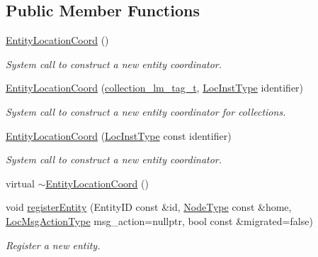 \subsection*{Public Member Functions}
\begin{DoxyCompactItemize}
\item 
\hyperlink{structvt_1_1location_1_1_entity_location_coord_a84d2166e5a2c192b081c222e15e93882}{Entity\+Location\+Coord} ()
\begin{DoxyCompactList}\small\item\em System call to construct a new entity coordinator. \end{DoxyCompactList}\item 
\hyperlink{structvt_1_1location_1_1_entity_location_coord_a0a25560f861221daafca33ce2657f04b}{Entity\+Location\+Coord} (\hyperlink{structvt_1_1location_1_1collection__lm__tag__t}{collection\+\_\+lm\+\_\+tag\+\_\+t}, \hyperlink{namespacevt_1_1location_a4db6456e8024af2d23fc5ae560fef866}{Loc\+Inst\+Type} identifier)
\begin{DoxyCompactList}\small\item\em System call to construct a new entity coordinator for collections. \end{DoxyCompactList}\item 
\hyperlink{structvt_1_1location_1_1_entity_location_coord_a5dcddcc605ab3cd16d94161e895b88e3}{Entity\+Location\+Coord} (\hyperlink{namespacevt_1_1location_a4db6456e8024af2d23fc5ae560fef866}{Loc\+Inst\+Type} const identifier)
\begin{DoxyCompactList}\small\item\em System call to construct a new entity coordinator. \end{DoxyCompactList}\item 
virtual \hyperlink{structvt_1_1location_1_1_entity_location_coord_af68fd9bb9fcbf02f693ba2af503ed409}{$\sim$\+Entity\+Location\+Coord} ()
\item 
void \hyperlink{structvt_1_1location_1_1_entity_location_coord_a3d7f6c252ad5cb8d1084620946245970}{register\+Entity} (Entity\+ID const \&id, \hyperlink{namespacevt_a866da9d0efc19c0a1ce79e9e492f47e2}{Node\+Type} const \&home, \hyperlink{namespacevt_1_1location_ad0a130e4d79e745543925240e13e8f08}{Loc\+Msg\+Action\+Type} msg\+\_\+action=nullptr, bool const \&migrated=false)
\begin{DoxyCompactList}\small\item\em Register a new entity. \end{DoxyCompactList}\item 

\end{DoxyCompactItemize}

